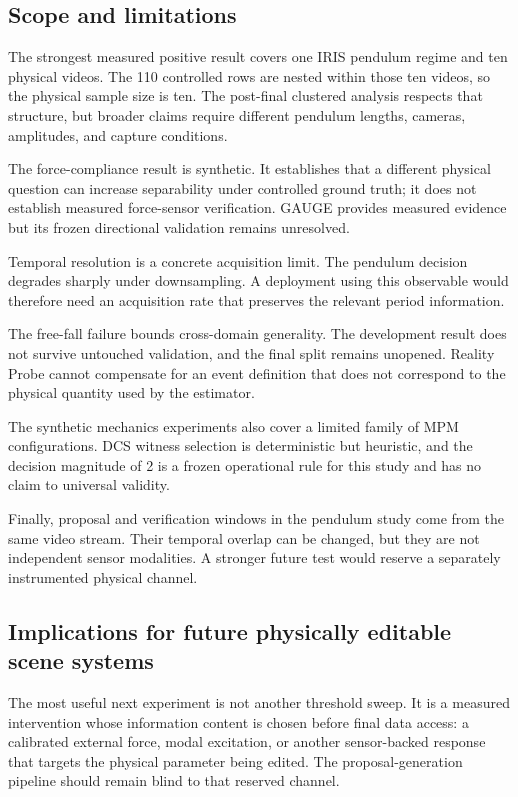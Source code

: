 \documentclass[acmtog]{acmart}
\begin{document}
\subsection{Scope and limitations}\label{limitations}

The strongest measured positive result covers one IRIS pendulum regime and ten physical videos. The 110 controlled rows are nested within those ten videos, so the physical sample size is ten. The post-final clustered analysis respects that structure, but broader claims require different pendulum lengths, cameras, amplitudes, and capture conditions.

The force-compliance result is synthetic. It establishes that a different physical question can increase separability under controlled ground truth; it does not establish measured force-sensor verification. GAUGE provides measured evidence but its frozen directional validation remains unresolved.

Temporal resolution is a concrete acquisition limit. The pendulum decision degrades sharply under downsampling. A deployment using this observable would therefore need an acquisition rate that preserves the relevant period information.

The free-fall failure bounds cross-domain generality. The development result does not survive untouched validation, and the final split remains unopened. Reality Probe cannot compensate for an event definition that does not correspond to the physical quantity used by the estimator.

The synthetic mechanics experiments also cover a limited family of MPM configurations. DCS witness selection is deterministic but heuristic, and the decision magnitude of 2 is a frozen operational rule for this study and has no claim to universal validity.

Finally, proposal and verification windows in the pendulum study come from the same video stream. Their temporal overlap can be changed, but they are not independent sensor modalities. A stronger future test would reserve a separately instrumented physical channel.

\subsection{Implications for future physically editable scene systems}\label{future-work}

The most useful next experiment is not another threshold sweep. It is a measured intervention whose information content is chosen before final data access: a calibrated external force, modal excitation, or another sensor-backed response that targets the physical parameter being edited. The proposal-generation pipeline should remain blind to that reserved channel.
\end{document}
